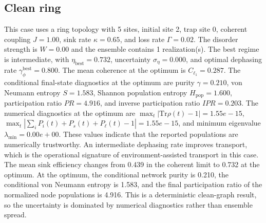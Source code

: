 \subsection{Clean ring}
This case uses a ring topology with 5 sites, initial site 2, trap site 0, coherent coupling $J=1.00$, sink rate $\kappa=0.65$, and loss rate $\Gamma=0.02$. The disorder strength is $W=0.00$ and the ensemble contains 1 realization(s).
The best regime is intermediate, with $\eta_{\mathrm{best}}=0.732$, uncertainty $\sigma_\eta=0.000$, and optimal dephasing rate $\gamma_\phi^{\mathrm{best}}=0.800$. The mean coherence at the optimum is $C_{\ell_1}=0.287$.
The conditional final-state diagnostics at the optimum are purity $\gamma=0.210$, von Neumann entropy $S=1.583$, Shannon population entropy $H_\mathrm{pop}=1.600$, participation ratio $PR=4.916$, and inverse participation ratio $IPR=0.203$.
The numerical diagnostics at the optimum are $\max_t |\mathrm{Tr}\rho(t)-1|=1.55e-15$, $\max_t |\sum_i P_i(t)+P_s(t)+P_\ell(t)-1|=1.55e-15$, and minimum eigenvalue $\lambda_\mathrm{min}=0.00e+00$. These values indicate that the reported populations are numerically trustworthy.
An intermediate dephasing rate improves transport, which is the operational signature of environment-assisted transport in this case. The mean sink efficiency changes from 0.439 in the coherent limit to 0.732 at the optimum. At the optimum, the conditional network purity is 0.210, the conditional von Neumann entropy is 1.583, and the final participation ratio of the normalized node populations is 4.916. This is a deterministic clean-graph result, so the uncertainty is dominated by numerical diagnostics rather than ensemble spread.

